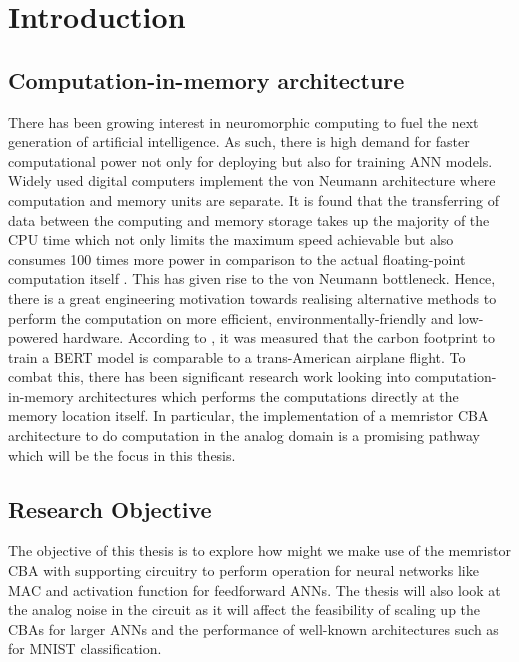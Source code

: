
\chapter{Introduction}
\label{ch:introduction}

\vspace{2em}

\section{Computation-in-memory architecture}

There has been growing interest in neuromorphic computing to fuel the next generation of artificial intelligence. As such, there is high demand for faster computational power not only for deploying but also for training \ac{ANN} models. Widely used digital computers implement the von Neumann architecture where computation and memory units are separate. It is found that the transferring of data between the computing and memory storage takes up the majority of the \acs{CPU} time which not only limits the maximum speed achievable but also consumes 100 times more power in comparison to the actual floating-point computation itself \cite{Zou_Xu_Chen_Yan_Han_2021}. This has given rise to the von Neumann bottleneck. Hence, there is a great engineering motivation towards realising alternative methods to perform the computation on more efficient, environmentally-friendly and low-powered hardware. According to \citet{Strubell_Ganesh_McCallum_2019} \cite{Strubell_Ganesh_McCallum_2019}, it was measured that the carbon footprint to train a \acs{BERT} model is comparable to a trans-American airplane flight. To combat this, there has been significant research work looking into computation-in-memory architectures which performs the computations directly at the memory location itself. In particular, the implementation of a memristor \ac{CBA} architecture to do computation in the analog domain is a promising pathway which will be the focus in this thesis.

\newpage

\section{Research Objective}
The objective of this thesis is to explore how might we make use of the memristor \acf{CBA} with supporting circuitry to perform operation for neural networks like \acf{MAC} and activation function for feedforward \acfp{ANN}. The thesis will also look at the analog noise in the circuit as it will affect the feasibility of scaling up the \acp{CBA} for larger \acp{ANN} and the performance of well-known architectures such as for MNIST classification.

